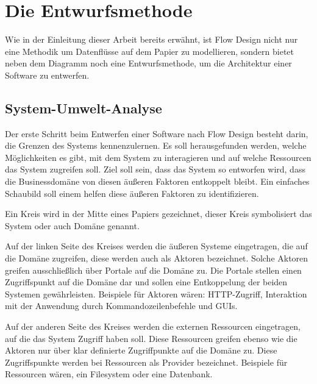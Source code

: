 \chapter{Die Entwurfsmethode}

Wie in der Einleitung dieser Arbeit bereits erwähnt, ist Flow Design nicht nur
eine Methodik um Datenflüsse auf dem Papier zu modellieren, sondern bietet neben dem Diagramm noch eine Entwurfsmethode, um die Architektur einer Software
zu entwerfen.

\section{System-Umwelt-Analyse}

Der erste Schritt beim Entwerfen einer Software nach Flow Design besteht
darin, die Grenzen des Systems kennenzulernen. Es soll herausgefunden
werden, welche Möglichkeiten es gibt, mit dem System zu interagieren und auf
welche Ressourcen das System zugreifen soll. Ziel soll sein, dass das System
so entworfen wird, dass die Businessdomäne von diesen äußeren Faktoren entkoppelt bleibt.
Ein einfaches Schaubild soll einem helfen diese äußeren Faktoren zu
identifizieren.

Ein Kreis wird in der Mitte eines Papiers gezeichnet, dieser
Kreis symbolisiert das System oder auch Domäne genannt.

Auf der linken Seite des Kreises werden die äußeren Systeme eingetragen, die
auf die Domäne zugreifen, diese werden auch als Aktoren bezeichnet.
Solche Aktoren greifen ausschließlich über Portale auf die Domäne zu.
Die Portale stellen einen Zugriffspunkt auf die Domäne dar und sollen eine Entkoppelung der beiden Systemen gewährleisten.
Beispiele für Aktoren wären:
HTTP-Zugriff, Interaktion mit der Anwendung durch Kommandozeilenbefehle und GUIs.

Auf der anderen Seite des Kreises werden die externen Ressourcen eingetragen, auf die
das System Zugriff haben soll. Diese Ressourcen greifen ebenso wie die Aktoren nur über klar definierte Zugriffpunkte auf die Domäne zu. Diese Zugriffspunkte werden bei Ressourcen als Provider bezeichnet.
Beispiele für Ressourcen wären, ein Filesystem oder eine Datenbank.


